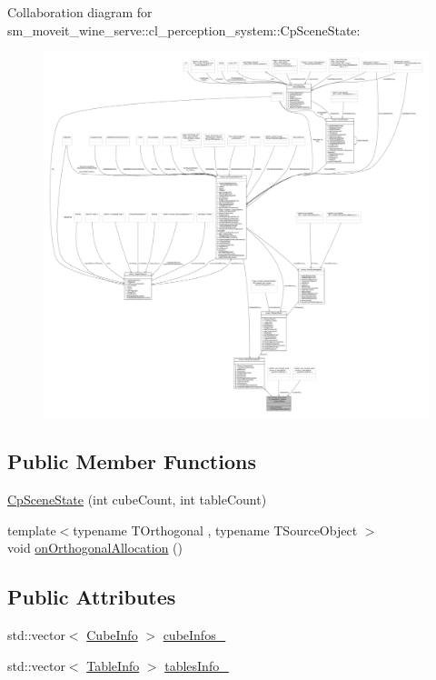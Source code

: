Collaboration diagram for sm\+\_\+moveit\+\_\+wine\+\_\+serve\+:\+:cl\+\_\+perception\+\_\+system\+:\+:Cp\+Scene\+State\+:
\nopagebreak
\begin{figure}[H]
\begin{center}
\leavevmode
\includegraphics[width=350pt]{classsm__moveit__wine__serve_1_1cl__perception__system_1_1CpSceneState__coll__graph}
\end{center}
\end{figure}
\subsection*{Public Member Functions}
\begin{DoxyCompactItemize}
\item 
\hyperlink{classsm__moveit__wine__serve_1_1cl__perception__system_1_1CpSceneState_a9e2a7f4bdab17899c9336edb306ebdf2}{Cp\+Scene\+State} (int cube\+Count, int table\+Count)
\item 
{\footnotesize template$<$typename T\+Orthogonal , typename T\+Source\+Object $>$ }\\void \hyperlink{classsm__moveit__wine__serve_1_1cl__perception__system_1_1CpSceneState_a2dc23d367112dac303762938ca688bd9}{on\+Orthogonal\+Allocation} ()
\end{DoxyCompactItemize}
\subsection*{Public Attributes}
\begin{DoxyCompactItemize}
\item 
std\+::vector$<$ \hyperlink{structsm__moveit__wine__serve_1_1cl__perception__system_1_1CubeInfo}{Cube\+Info} $>$ \hyperlink{classsm__moveit__wine__serve_1_1cl__perception__system_1_1CpSceneState_a0b2d760a8ff2cb5e3735879d67ea3e67}{cube\+Infos\+\_\+}
\item 
std\+::vector$<$ \hyperlink{structsm__moveit__wine__serve_1_1cl__perception__system_1_1TableInfo}{Table\+Info} $>$ \hyperlink{classsm__moveit__wine__serve_1_1cl__perception__system_1_1CpSceneState_aa6aea93bb143d2def50c97ec6b55e4cf}{tables\+Info\+\_\+}
\end{DoxyCompactItemize}
